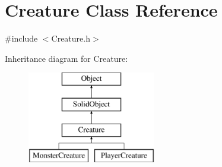 \hypertarget{class_creature}{}\section{Creature Class Reference}
\label{class_creature}


{\ttfamily \#include $<$Creature.\+h$>$}

Inheritance diagram for Creature\+:\begin{figure}[H]
\begin{center}
\leavevmode
\includegraphics[height=4.000000cm]{class_creature}
\end{center}
\end{figure}

